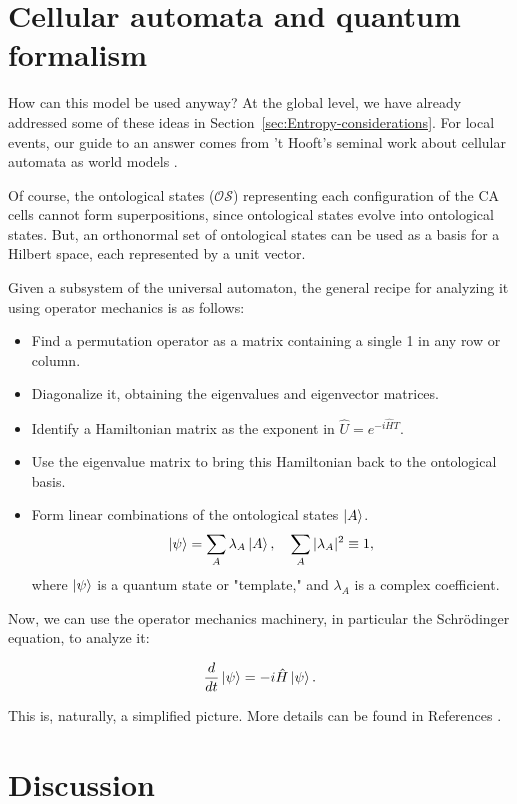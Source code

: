 \documentclass[12pt,english]{article}
\begin{document}
\section{Cellular automata and quantum formalism} \label{sec:bridge}How can this model be used anyway? At the global level, we have already addressed some of these ideas in Section~\ref{sec:Entropy-considerations}. For local events, our guide to an answer comes from 't Hooft's seminal work about cellular automata as world models \cite{thooft}.

Of course, the ontological states ($\mathcal{OS}$) representing each configuration of the CA cells cannot form superpositions, since ontological states evolve into ontological states. But, an orthonormal set of ontological states can be used as a basis for a Hilbert space, each represented by a unit vector.

Given a subsystem of the universal automaton, the general recipe for analyzing it using operator mechanics is as follows:

\begin{itemize}
    \item Find a permutation operator as a matrix containing a single 1 in any row or column.
    \item Diagonalize it, obtaining the eigenvalues and eigenvector matrices.
    \item Identify a Hamiltonian matrix as the exponent in $\hat{U}=e^{-i\hat{H}T}$.
    \item Use the eigenvalue matrix to bring this Hamiltonian back to the ontological basis.
    \item Form linear combinations of the ontological states $\ket{A}$.
\[
\ket{\psi} = \sum_A \lambda_A \ket{A}, \quad \sum_A |\lambda_A|^2 \equiv 1,
\]
where $\ket{\psi}$ is a quantum state or "template," and $\lambda_A$ is a complex coefficient.
\end{itemize}

Now, we can use the operator mechanics machinery, in particular the Schrödinger equation, to analyze it:

\[
\frac{d}{dt}\ket{\psi} = -i\hat{H}\ket{\psi}.
\]

This is, naturally, a simplified picture. More details can be found in References \cite{thooft,Elze2019,rizzo2020perturbing}.

\section{Discussion\label{sec:Discussion}}
\end{document}
